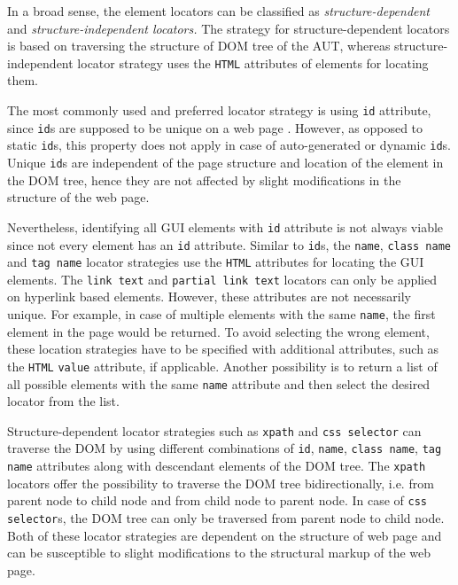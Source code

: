In a broad sense, the element locators can be classified as \textit{structure-dependent}  and \textit{structure-independent locators.}  The strategy for structure-dependent locators is based on traversing the structure of DOM tree of the AUT, whereas structure-independent locator strategy uses the \texttt{HTML} attributes of elements for locating them. 

The most commonly used and preferred locator strategy is using \texttt{id} attribute, since \texttt{id}s are supposed to be unique on a web page \cite{W3CIDs}. However, as opposed to static \texttt{id}s, this property does not apply in case of auto-generated or dynamic \texttt{id}s. Unique \texttt{id}s are independent of the page structure and location of the element in the DOM tree, hence they are not affected by slight modifications in the structure of the web page. 

Nevertheless, identifying all GUI elements with \texttt{id} attribute is not always viable since not every element has an \texttt{id} attribute. Similar to \texttt{id}s, the \texttt{name}, \texttt{class name} and \texttt{tag name} locator strategies use the \texttt{HTML} attributes for locating the GUI elements. 
The \texttt{link text} and \texttt{partial link text} locators can only be applied on hyperlink based elements. However, these attributes are not necessarily unique. For example, in case of multiple elements with the same \texttt{name}, the first element in the page would be returned. To avoid selecting the wrong element, these location strategies have to be specified with additional attributes, such as the \texttt{HTML} \texttt{value} attribute, if applicable. Another possibility is to return a list of all possible elements with the same \texttt{name} attribute and then select the desired locator from the list. 

Structure-dependent locator strategies such as \texttt{xpath} and \texttt{css selector} can traverse the DOM by using different combinations of \texttt{id}, \texttt{name}, \texttt{class name}, \texttt{tag name} attributes along with descendant elements of the DOM tree. The \texttt{xpath} locators offer the possibility to traverse the DOM tree bidirectionally, i.e. from parent node to child node and from child node to parent node. In case of \texttt{css selector}s, the DOM tree can only be traversed from parent node to child node. Both of these locator strategies are dependent on the structure of web page and can be susceptible to slight modifications to the structural markup of the web page.  
 
